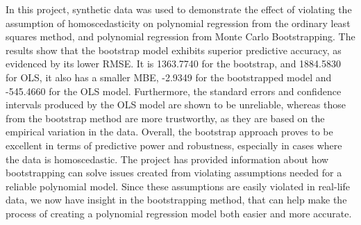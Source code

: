 In this project, synthetic data was used to demonstrate the effect of violating the assumption of homoscedasticity on polynomial regression from the ordinary least squares method, and polynomial regression from Monte Carlo Bootstrapping. The results show that the bootstrap model exhibits superior predictive accuracy, as evidenced by its lower RMSE. It is 1363.7740 for the bootstrap, and 1884.5830 for OLS, it also has a smaller MBE, -2.9349 for the bootstrapped model and -545.4660 for the OLS model. Furthermore, the standard errors and confidence intervals produced by the OLS model are shown to be unreliable, whereas those from the bootstrap method are more trustworthy, as they are based on the empirical variation in the data. Overall, the bootstrap approach proves to be excellent in terms of predictive power and robustness, especially in cases where the data is homoscedastic.
The project has provided information about how bootstrapping can solve issues created from violating assumptions needed for a reliable polynomial model. Since these assumptions are easily violated in real-life data, we now have insight in the bootstrapping method, that can help make the process of creating a polynomial regression model both easier and more accurate. 
